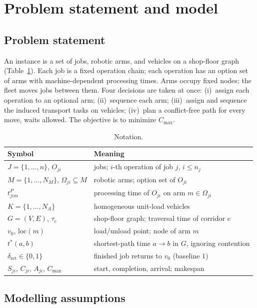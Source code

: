 \section{Problem statement and model}
\label{sec:Chapter_III}
\subsection{Problem statement}

An instance is a set of jobs, robotic arms, and vehicles on a shop-floor graph (Table~\ref{tab:notation}).
Each job is a fixed operation chain; each operation has an option set of arms with machine-dependent processing times.
Arms occupy fixed nodes; the fleet moves jobs between them.
Four decisions are taken at once:
(i)~assign each operation to an optional arm;
(ii)~sequence each arm;
(iii)~assign and sequence the induced transport tasks on vehicles;
(iv)~plan a conflict-free path for every move, waits allowed.
The objective is to minimize $C_{\max}$.

\begin{table}[t]
\caption{Notation.}
\label{tab:notation}
\footnotesize
\renewcommand{\arraystretch}{0.95}
\begin{tabular}{@{}ll@{}}
\toprule
Symbol & Meaning \\
\midrule
$J=\{1,\dots,n\}$, $O_{ji}$ & jobs; $i$-th operation of job $j$, $i\le n_j$ \\
$M=\{1,\dots,N_M\}$, $\Omega_{ji}\subseteq M$ & robotic arms; option set of $O_{ji}$ \\
$t^P_{jim}$ & processing time of $O_{ji}$ on arm $m\in\Omega_{ji}$ \\
$K=\{1,\dots,N_A\}$ & homogeneous unit-load vehicles \\
$G=(V,E)$, $\tau_e$ & shop-floor graph; traversal time of corridor $e$ \\
$v_0$, $\mathrm{loc}(m)$ & load/unload point; node of arm $m$ \\
$t^{*}(a,b)$ & shortest-path time $a\to b$ in $G$, ignoring contention \\
$\delta_{\mathrm{ret}}\in\{0,1\}$ & finished job returns to $v_0$ (baseline $1$) \\
$S_{ji}$, $C_{ji}$, $A_{ji}$, $C_{\max}$ & start, completion, arrival; makespan \\
\bottomrule
\end{tabular}
\end{table}

\subsection{Modelling assumptions}
\label{sec:assumptions}

